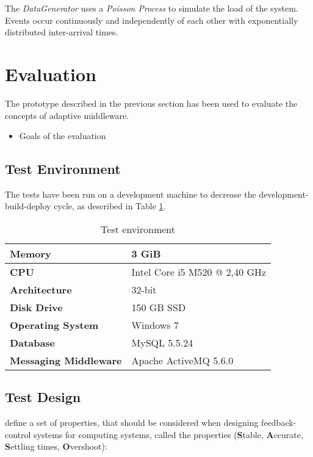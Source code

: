 The \emph{DataGenerator} uses a \emph{Poisson Process} to simulate the load of the system. Events occur continuously and independently of each other with exponentially distributed inter-arrival times.

\section{Evaluation}
\label{sec:ch05_evaluation}

The prototype described in the previous section has been used to evaluate the concepts of adaptive middleware. 

\begin{itemize}
	\item Goals of the evaluation
\end{itemize}

\subsection{Test Environment}

The tests have been run on a development machine to decrease the development-build-deploy cycle, as described in Table \ref{table:ch05_test_environment}.

\begin{table}[htbp]
	\centering
	\begin{tabularx}{\textwidth}{@{} l X @{}}
		\caption{Test environment} \label{table:ch05_test_environment} \\
		\toprule
		\bfseries Memory & 3 GiB\\
		\midrule
		\bfseries CPU & Intel Core i5 M520 @ 2,40 GHz \\
		\midrule
		\bfseries Architecture & 32-bit\\
		\midrule
		\bfseries Disk Drive & 150 GB SSD\\
		\midrule
		\bfseries Operating System & Windows 7\\
		\midrule 
		\bfseries Database & MySQL 5.5.24\\
		\midrule
		\bfseries Messaging Middleware & Apache ActiveMQ 5.6.0\\
		\bottomrule
	\end{tabularx}
\end{table}

\subsection{Test Design}

\cite{Abdelzaher:2008ub} define a set of properties, that should be considered when designing feedback-control systems for computing systems, called the  properties (\textbf{S}table, \textbf{A}ccurate, \textbf{S}ettling times, \textbf{O}vershoot):

